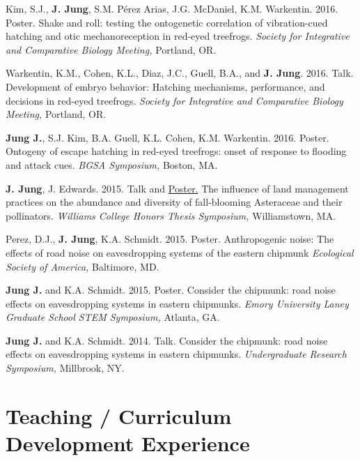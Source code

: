 \documentclass[margin,line]{res}
\begin{document}
\begin{resume}
\vspace{-.25cm}
Kim, S.J., {\bf J. Jung}, S.M. Pérez Arias, J.G. McDaniel, K.M. Warkentin. {2016.} {Poster.} {Shake and roll: testing the ontogenetic correlation of vibration-cued hatching and otic mechanoreception in red-eyed treefrogs.} {\it Society for Integrative and Comparative Biology Meeting,} {Portland, OR.}

\vspace{-.25cm}
Warkentin, K.M., Cohen, K.L., Diaz, J.C., Guell, B.A., and {\bf J. Jung}. {2016.} {Talk.} {Development of embryo behavior: Hatching mechanisms, performance, and decisions in red-eyed treefrogs.} {\it Society for Integrative and Comparative Biology Meeting,} {Portland, OR.}

\vspace{-.25cm}
{\bf Jung J.}, S.J. Kim, B.A. Guell, K.L. Cohen, K.M. Warkentin. {2016.} {Poster.} {Ontogeny of escape hatching in red-eyed treefrogs: onset of response to flooding and attack cues.} {\it BGSA Symposium,} {Boston, MA.}

\vspace{-.25cm}
{\bf J. Jung}, J. Edwards. {2015.} {Talk and} \href{https://drive.google.com/file/d/16czOtnr35iNB3qv9wmMUU0NxrXjkh_Wz/view?usp=sharing}{\ttfamily Poster.} {The influence of land management practices on the abundance and diversity of fall-blooming Asteraceae and their pollinators.} {\it Williams College Honors Thesis Symposium,} {Williamstown, MA.}

\vspace{-.25cm}
Perez, D.J., {\bf J. Jung}, K.A. Schmidt. {2015.} {Poster.} {Anthropogenic noise: The effects of road noise on eavesdropping systems of the eastern chipmunk} {\it Ecological Society of America,} {Baltimore, MD.}

\vspace{-.25cm}
{\bf Jung J.} and K.A. Schmidt. {2015.} {Poster.} {Consider the chipmunk: road noise effects on eavesdropping systems in eastern chipmunks.} {\it Emory University Laney Graduate School STEM Symposium,} {Atlanta, GA. }

\vspace{-.25cm}
{\bf Jung J.} and K.A. Schmidt. {2014.} {Talk.} {Consider the chipmunk: road noise effects on eavesdropping systems in eastern chipmunks.} {\it Undergraduate Research Symposium,} {Millbrook, NY. }

\section{\sc Teaching / Curriculum Development Experience}


\end{resume}
\end{document}
